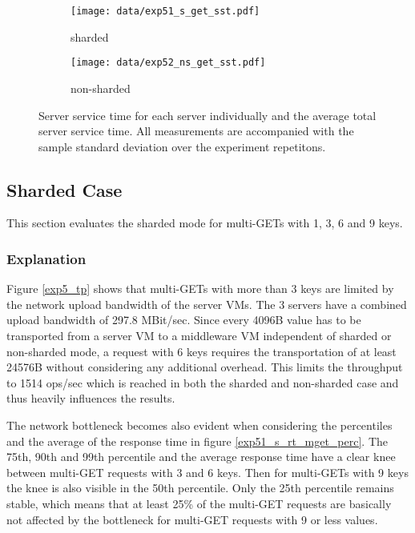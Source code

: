\documentclass[report.tex]{subfiles}
\begin{document}
\begin{figure}[H]
	\begin{subfigure}[b]{.49\linewidth}
		\centering
		\texttt{[image: data/exp51\_s\_get\_sst.pdf]}
		\caption{sharded}\label{exp51_s_get_sst}
	\end{subfigure}\hfill
	\begin{subfigure}[b]{.49\linewidth}
		\centering
		\texttt{[image: data/exp52\_ns\_get\_sst.pdf]}
		\caption{non-sharded}\label{exp52_s_get_sst}
	\end{subfigure}%
	\caption{Server service time for each server individually and the average total server service time. All measurements are accompanied with the sample standard deviation over the experiment repetitons.}
\end{figure}

\subsection{Sharded Case}

This section evaluates the sharded mode for multi-GETs with 1, 3, 6 and 9 keys.

\subsubsection{Explanation}

Figure \ref{exp5_tp} shows that multi-GETs with more than 3 keys are limited by the network upload bandwidth of the server VMs. The 3 servers have a combined upload bandwidth of 297.8 MBit/sec. Since every 4096B value has to be transported from a server VM to a middleware VM independent of sharded or non-sharded mode, a request with 6 keys requires the transportation of at least 24576B without considering any additional overhead. This limits the throughput to 1514 ops/sec which is reached in both the sharded and non-sharded case and thus heavily influences the results.

The network bottleneck becomes also evident when considering the percentiles and the average of the response time in figure \ref{exp51_s_rt_mget_perc}. The 75th, 90th and 99th percentile and the average response time have a clear knee between multi-GET requests with 3 and 6 keys. Then for multi-GETs with 9 keys the knee is also visible in the 50th percentile. Only the 25th percentile remains stable, which means that at least 25\% of the multi-GET requests are basically not affected by the bottleneck for multi-GET requests with 9 or less values.
\end{document}
